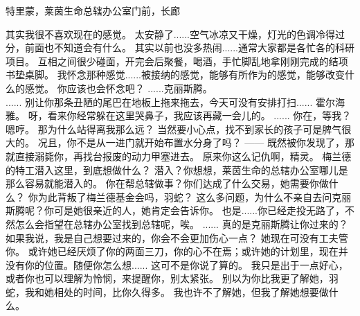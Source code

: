 \documentclass[openany]{book}
\begin{document}
特里蒙，莱茵生命总辖办公室门前，长廊
\begin{dialogue}
     其实我很不喜欢现在的感觉。
     太安静了......空气冰凉又干燥，灯光的色调冷得过分，前面也不知道会有什么。
     其实以前也没多热闹......通常大家都是各忙各的科研项目。
     互相之间很少碰面，开完会后聚餐，喝酒，手忙脚乱地拿刚刚完成的结项书垫桌脚。
     我怀念那种感觉......被接纳的感觉，能够有所作为的感觉，能够改变什么的感觉。
     你应该也会怀念吧？
     ......克丽斯腾。
    \\
     ......
     别让你那条丑陋的尾巴在地板上拖来拖去，今天可没有安排打扫......
     霍尔海雅。
     呀，看来你经常躲在这里哭鼻子，我应该再藏一会儿的。
     ......
     你在，等我？
     嗯哼。
     那为什么站得离我那么远？
     当然要小心点，找不到家长的孩子可是脾气很大的。
     况且，你不是从一进门就开始布置水分身了吗？
     ——
     既然被你发现了，那就直接溺毙你，再找台报废的动力甲塞进去。
     原来你这么记仇啊，精灵。
     梅兰德的特工潜入这里，到底想做什么？
     潜入？你想想，莱茵生命的总辖办公室哪儿是那么容易就能潜入的。
     你在帮总辖做事？你们达成了什么交易，她需要你做什么？
     你为此背叛了梅兰德基金会吗，羽蛇？
     这么多问题，为什么不亲自去问克丽斯腾呢？你可是她很亲近的人，她肯定会告诉你。
     也是......你已经走投无路了，不然怎么会指望在总辖办公室找到总辖呢，唉。
     ......
     真的是克丽斯腾让你过来的？
     如果我说，我是自己想要过来的，你会不会更加伤心一点？
     她现在可没有工夫管你。
     或许她已经厌烦了你的两面三刀，你的心不在焉；或许她的计划里，现在并没有你的位置。随便你怎么想......
     这可不是你说了算的。
     我只是出于一点好心，或者你也可以理解为怜悯，来提醒你，别太紧张。
     别以为你比我更了解她，羽蛇，我和她相处的时间，比你久得多。
     我也许不了解她，但我了解她想要做什么。
\end{dialogue}
\end{document}
